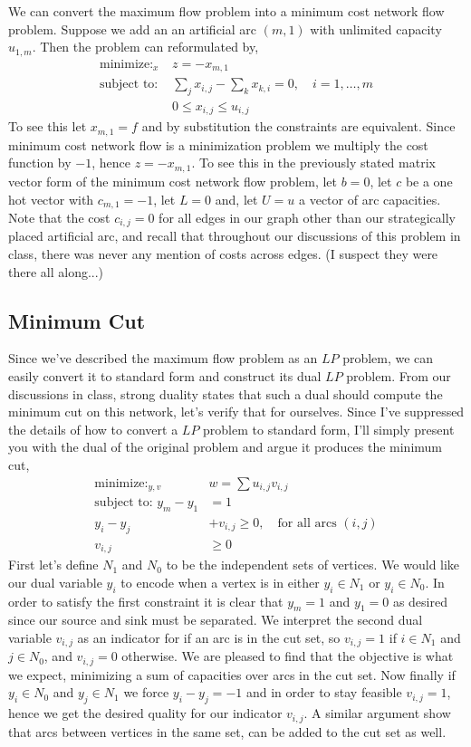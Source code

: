 \documentclass[12pt]{amsart}
\begin{document}
We can convert the maximum flow problem into a minimum cost network flow problem. Suppose we add an an artificial arc $(m, 1)$ with unlimited 
capacity $u_{1, m}$. Then the problem can reformulated by, 
\begin{align*}
    \mathop{\text{minimize: }}_{x} &z = -x_{m, 1}\\
    \text{subject to: } &\sum_{j}x_{i, j} - \sum_{k}x_{k, i} = 0, \quad i = 1, \dots, m\\
    &0 \leq x_{i, j} \leq u_{i, j}
\end{align*}
To see this let $x_{m,1} = f$ and by substitution the constraints are equivalent. Since minimum cost network flow is a minimization problem we multiply the cost function by $-1$, hence $z = -x_{m, 1}$. To see this in the previously stated matrix vector form of the minimum cost network flow problem, let $b = 0$, let $c$ be a one hot vector with $c_{m,1} = -1$, let $L = 0$ and, let $U = u$ a vector of arc capacities. Note that the cost $c_{i, j} = 0$ for all edges in our graph other than our strategically placed artificial arc, and recall that throughout our discussions of this problem in class, there was never any mention of costs across edges. (I suspect they were there all along...) %

\subsection{Minimum Cut}
Since we've described the maximum flow problem as an $LP$ problem, we can easily convert it to standard form and construct its dual $LP$ problem. From our discussions in class, strong duality states that such a dual should compute the minimum cut on this network, let's verify that for ourselves. Since I've suppressed the details of how to convert a $LP$ problem to standard form, I'll simply present you with the dual of the original problem and argue it produces the minimum cut,
\begin{align*}
    \mathop{\text{minimize: }}_{y, v}  &w = \sum u_{i, j} v_{i, j}\\
    \text{subject to: } y_m - y_1 &= 1\\
    y_i - y_j &+ v_{i, j} \geq 0, \quad \text{for all arcs $(i, j)$}\\
    v_{i, j} &\geq 0
\end{align*}
First let's define $N_1$ and $N_0$ to be the independent sets of vertices. We would like our dual variable $y_i$ to encode when a vertex is in either $y_i \in N_1$ or $y_i \in N_0$. In order to satisfy the first constraint it is clear that $y_m = 1$ and $y_1 = 0$ as desired since our source and sink must be separated. We interpret the second dual variable $v_{i, j}$ as an indicator for if an arc is in the cut set, so $v_{i, j} = 1$ if $i \in N_1$ and $j \in N_0$, and $v_{i, j} = 0$ otherwise. We are pleased to find that the objective is what we expect, minimizing a sum of capacities over arcs in the cut set. Now finally if $y_i \in N_0$ and $y_j \in N_1$ we force $y_i - y_j = -1$ and in order to stay feasible $v_{i, j} = 1$, hence we get the desired quality for our indicator $v_{i, j}$. A similar argument show that arcs between vertices in the same set, can be added to the cut set as well. 
\end{document}
